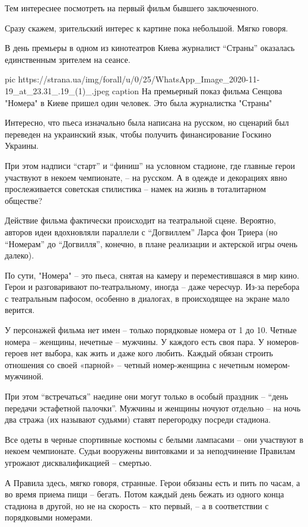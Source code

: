 Тем интереснее посмотреть на первый фильм бывшего заключенного.

Сразу скажем, зрительский интерес к картине пока небольшой. Мягко говоря.

В день премьеры в одном из кинотеатров Киева журналист \enquote{Страны} оказалась
единственным зрителем на сеансе.

\ifcmt
pic https://strana.ua/img/forall/u/0/25/WhatsApp_Image_2020-11-19_at_23.31_.19_(1)_.jpeg
caption На премьерный показ фильма Сенцова "Номера" в Киеве пришел один человек. Это была журналистка "Страны"
\fi

Интересно, что пьеса изначально была написана на русском, но сценарий был
переведен на украинский язык, чтобы получить финансирование Госкино
Украины.

При этом надписи \enquote{старт} и \enquote{финиш} на условном стадионе, где главные герои
участвуют в некоем чемпионате, – на русском. А в одежде и декорациях явно
прослеживается советская стилистика – намек на жизнь в тоталитарном
обществе?

Действие фильма фактически происходит на театральной сцене. Вероятно,
авторов идеи вдохновляли параллели с \enquote{Догвиллем} Ларса фон Триера (но
\enquote{Номерам} до \enquote{Догвилля}, конечно, в плане реализации и актерской игры
очень далеко).

По сути, "Номера" – это пьеса, снятая на камеру и переместившаяся в мир
кино. Герои и разговаривают по-театральному, иногда – даже чересчур. Из-за
перебора с театральным пафосом, особенно в диалогах, в происходящее на
экране мало верится.

У персонажей фильма нет имен – только порядковые номера от 1 до 10. Четные
номера – женщины, нечетные – мужчины. У каждого есть своя пара. У
номеров-героев нет выбора, как жить и даже кого любить. Каждый обязан
строить отношения со своей «парной» – четный номер-женщина с нечетным
номером-мужчиной.

При этом \enquote{встречаться} наедине они могут только в особый праздник –
\enquote{день передачи эстафетной палочки}. Мужчины и женщины ночуют отдельно –
на ночь два стража (их называют судьями) ставят перегородку посреди стадиона.

Все одеты в черные спортивные костюмы с белыми лампасами – они участвуют в
некоем чемпионате. Судьи вооружены винтовками и за неподчинение Правилам
угрожают дисквалификацией – смертью.

А Правила здесь, мягко говоря, странные. Герои обязаны есть и пить по
часам, а во время приема пищи – бегать. Потом каждый день бежать из одного
конца стадиона в другой, но не на скорость – кто первый, – а в
соответствии с порядковыми номерами.

